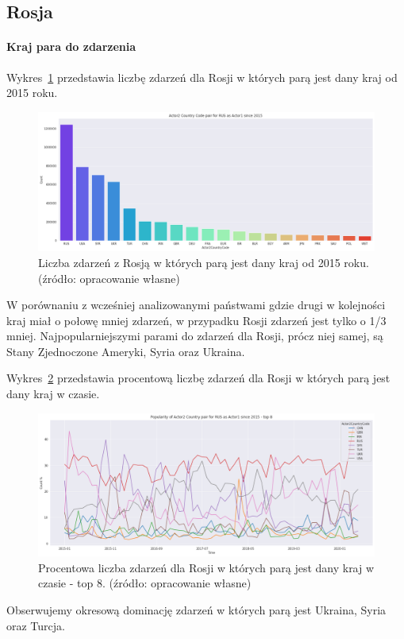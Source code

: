 \documentclass[11pt]{report}
\begin{document}
    \subsection{Rosja}

    \paragraph{Kraj para do zdarzenia}

    Wykres~\ref{fig:RUSpair} przedstawia liczbę zdarzeń dla Rosji w których parą jest dany kraj od 2015 roku.

    \begin{figure}[!htp]
        \centering
        \includegraphics[width=\linewidth]{fig/RUS/RUSactor2Pair.png}
        \caption{Liczba zdarzeń z Rosją w których parą jest dany kraj od 2015 roku. (źródło: opracowanie własne)}
        \label{fig:RUSpair}
    \end{figure}
    W porównaniu z wcześniej analizowanymi państwami gdzie drugi w kolejności kraj miał o połowę mniej zdarzeń, w przypadku Rosji zdarzeń jest tylko o 1/3 mniej.
    Najpopularniejszymi parami do zdarzeń dla Rosji, prócz niej samej, są Stany Zjednoczone Ameryki, Syria oraz Ukraina.

    Wykres~\ref{fig:RUSpairPerc} przedstawia procentową liczbę zdarzeń dla Rosji w których parą jest dany kraj w czasie.
    \begin{figure}[!htp]
        \centering
        \includegraphics[width=\linewidth]{fig/RUS/RUSactor2PairPercinTIME.png}
        \caption{Procentowa liczba zdarzeń dla Rosji w których parą jest dany kraj w czasie - top 8. (źródło: opracowanie własne)}
        \label{fig:RUSpairPerc}
    \end{figure}
    Obserwujemy okresową dominację zdarzeń w których parą jest Ukraina, Syria oraz Turcja.
\end{document}
